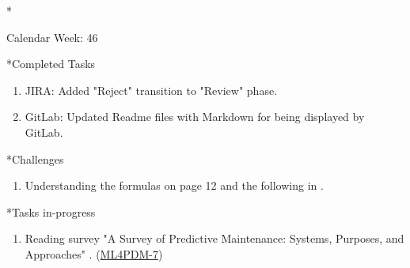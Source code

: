 \documentclass[11pt,a4paper]{article}
\begin{document}
\newpage
\begin{section}*{Calendar Week: 46 \hfill \date{13 November, 2020}}
 \begin{refsection}

   \begin{subsection}*{Completed Tasks}
     \begin{enumerate}
       \item
             JIRA: Added "Reject" transition to "Review" phase.
       \item
             GitLab: Updated Readme files with Markdown for being displayed by GitLab.
     \end{enumerate}
   \end{subsection}

   \begin{subsection}*{Challenges}
     \begin{enumerate}
       \item
             Understanding the formulas on page 12 and the following in \cite{DBLP:journals/corr/abs-1912-07383}.
     \end{enumerate}
   \end{subsection}

   \begin{subsection}*{Tasks in-progress}
     \begin{enumerate}
       \item
             Reading survey "A Survey of Predictive Maintenance: Systems, Purposes, and Approaches" \cite{DBLP:journals/corr/abs-1912-07383}. (\href{https://ml4pdm.atlassian.net/browse/ML4PDM-7}{ML4PDM-7})
     \end{enumerate}
   \end{subsection}

   \printbibliography
 \end{refsection}
\end{section}
\end{document}
